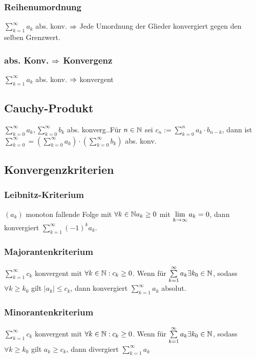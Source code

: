 \subsubsection*{Reihenumordnung}
$\sum\limits_{k = 1}^\infty a_k$ abs. konv. $\Rightarrow$ Jede Umordnung der Glieder konvergiert gegen den selben Grenzwert.
\subsubsection*{abs. Konv. \texorpdfstring{$\Rightarrow$}{folgt} Konvergenz}
$\sum\limits_{k = 1}^\infty a_k$ abs. konv. $\Rightarrow$ konvergent
\subsection*{Cauchy-Produkt}
$\sum\limits_{k = 0}^\infty a_k, \sum\limits_{k = 0}^\infty b_k$ abs. konverg..Für $n \in \mathbb N$ sei $c_n := \sum\limits_{k = 0}^n a_k \cdot b_{n - k}$, dann ist $\sum\limits_{k = 0}^\infty = \left(\sum\limits_{k = 0}^\infty a_k\right) \cdot \left(\sum\limits_{k = 0}^\infty b_k\right)$ abs. konv.
\subsection*{Konvergenzkriterien}

\subsubsection*{Leibnitz-Kriterium}
$(a_k)$ monoton fallende Folge mit $\forall k \in \mathbb N a_k \geq 0$ mit $\lim\limits_{k \rightarrow \infty}a_k = 0$, dann konvergiert $\sum\limits_{k = 1}^\infty (-1)^k a_k$.
\subsubsection*{Majorantenkriterium}
$\sum\limits_{k = 1}^\infty c_k$ konvergent mit $\forall k \in \mathbb N: c_k \geq 0$. Wenn für $\sum\limits_{k = 1}^\infty a_k \exists k_0 \in \mathbb N$, sodass $\forall k \geq k_0$ gilt $|a_k| \leq c_k$, dann konvergiert $\sum\limits_{k = 1}^\infty a_k$ absolut.
\subsubsection*{Minorantenkriterium}
$\sum\limits_{k = 1}^\infty c_k$ konvergent mit $\forall k \in \mathbb N: c_k \geq 0$. Wenn für $\sum\limits_{k = 1}^\infty a_k \exists k_0 \in \mathbb N$, sodass $\forall k \geq k_0$  gilt $a_k \geq c_k$, dann divergiert $\sum\limits_{k = 1}^\infty a_k$

